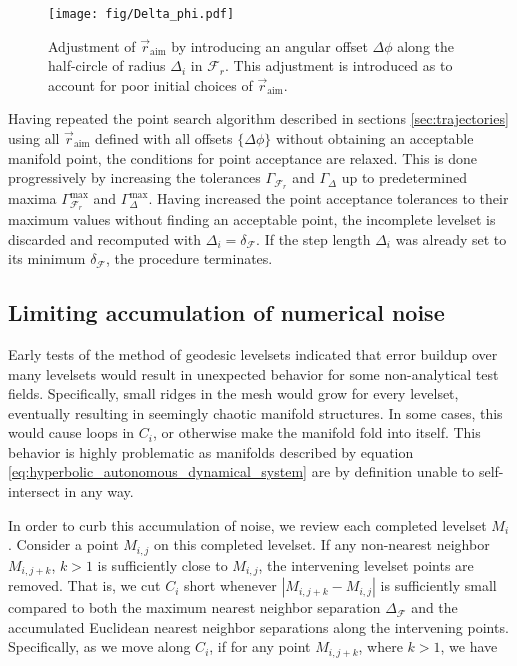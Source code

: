 \begin{figure}[h!] 
\centering
\texttt{[image: fig/Delta\_phi.pdf]}
\caption{Adjustment of $\vec{r}_{\text{aim}}$ by introducing an angular offset $\Delta\phi$ along the half-circle of radius $\Delta_i$ in $\mathcal{F}_r$. This adjustment is introduced as to account for poor initial choices of $\vec{r}_{\text{aim}}$.}\label{fig:adjust_r_aim}
\end{figure}

Having repeated the point search algorithm described in sections \ref{sec:trajectories} using all $\vec{r}_{\text{aim}}$ defined with all offsets $\{\Delta \phi\}$ without obtaining an acceptable manifold point, the conditions for point acceptance are relaxed. This is done progressively by increasing the tolerances $\Gamma_{\mathcal{F}_r}$ and $\Gamma_{\Delta}$ up to predetermined maxima $\Gamma_{\mathcal{F}_r}^{\text{max}}$ and $\Gamma_{\Delta}^{\text{max}}$. Having increased the point acceptance tolerances to their maximum values without finding an acceptable point, the incomplete levelset is discarded and recomputed with $\Delta_i = \delta_{\mathcal{F}}$. If the step length $\Delta_i$ was already set to its minimum $\delta_{\mathcal{F}}$, the procedure terminates.

\subsection{Limiting accumulation of numerical noise}\label{sec:limit_numerical_noise}

Early tests of the method of geodesic levelsets indicated that error buildup over many levelsets would result in unexpected behavior for some non-analytical test fields. Specifically, small ridges in the mesh would grow for every levelset, eventually resulting in seemingly chaotic manifold structures. In some cases, this would cause loops in $C_i$, or otherwise make the manifold fold into itself. This behavior is highly problematic as manifolds described by equation \eqref{eq:hyperbolic_autonomous_dynamical_system} are by definition unable to self-intersect in any way.

In order to curb this accumulation of noise, we review each completed levelset $M_i$. Consider a point $M_{i,j}$ on this completed levelset. If any non-nearest neighbor $M_{i,j+k}$, $k > 1$ is sufficiently close to $M_{i,j}$, the intervening levelset points are removed. That is, we cut $C_i$ short whenever 
$\left| M_{i,j+k} - M_{i,j} \right|$ is sufficiently small compared to both the maximum nearest neighbor separation $\Delta_{\mathcal{F}}$ and the accumulated Euclidean nearest neighbor separations along the intervening points. Specifically, as we move along $C_i$, if for any point $M_{i,j+k}$, where $k > 1$, we have

